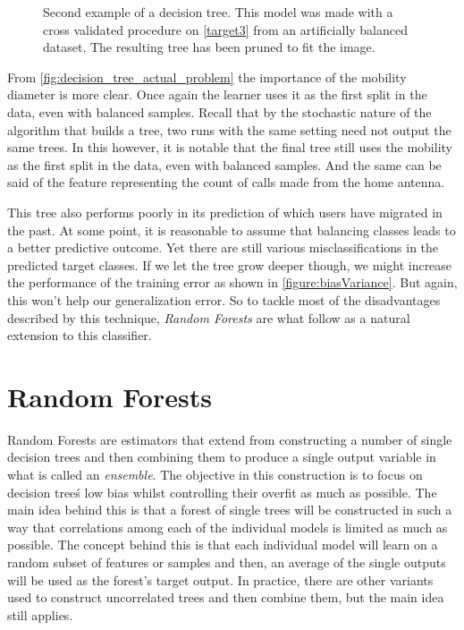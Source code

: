 \begin{figure}
	\centering
	\caption{ Second example of a decision tree. This model was made with a cross validated procedure on \cref{target3} from an artificially balanced dataset. The resulting tree has been pruned to fit the image.}
	\label{fig:decision_tree_actual_problem2}
\end{figure}


\smallskip

From \cref{fig:decision_tree_actual_problem} the importance of the mobility diameter is more clear.
Once again the learner uses it as the first split in the data, even with balanced samples.
Recall that by the stochastic nature of the algorithm that builds a tree, two runs with the same setting need not output the same trees.
In this however, it is notable that the final tree still uses the mobility as the first split in the data, even with balanced samples.
And the same can be said of the feature representing the count of calls made from the home antenna.

This tree also performs poorly in its prediction of which users have migrated in the past.
At some point, it is reasonable to assume that balancing classes leads to a better predictive outcome.
Yet there are still various misclassifications in the predicted target classes.
If we let the tree grow deeper though, we might increase the performance of the training error as shown in \cref{figure:biasVariance}.
But again, this won't help our generalization error.
So to tackle most of the disadvantages described by this technique, \textit{Random Forests} are what follow as a natural extension to this classifier.


\section{ Random Forests}\label{section:random_forests}

Random Forests are estimators that extend from constructing a number of single decision trees and then combining them to produce a single output variable in what is called an \textit{ensemble}.
The objective in this construction is to focus on decision tree\'s low bias whilst controlling their overfit as much as possible.
The main idea behind this is that a forest of single trees will be constructed in such a way that correlations among each of the individual models is limited as much as possible.
The concept behind this is that each individual model will learn on a random subset of features or samples and then, an average of the single outputs will be used as the forest's target output.
In practice, there are other variants used to construct uncorrelated trees and then combine them, but the main idea still applies.

